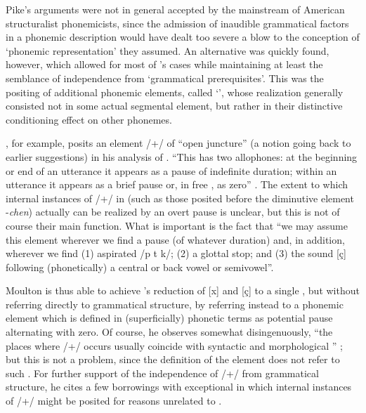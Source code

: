 Pike's arguments were not in general accepted by the mainstream of
American structuralist phonemicists, since the admission of inaudible
grammatical factors in a phonemic description would have dealt too
severe a blow to the conception of `phonemic representation' they
assumed. An alternative was quickly found, however, which allowed for
most of {\Pike}'s cases while maintaining at least the semblance of
independence from `grammatical prerequisites'. This was the positing
of additional phonemic elements, called `', whose realization
generally consisted not in some actual segmental element, but rather
in their distinctive conditioning effect on other phonemes.

\citet{moulton47:juncture}, for example, posits an element /+/ of
``open juncture'' (a notion going back to
 earlier suggestions) in his
analysis of . ``This  has two allophones: at the
beginning or end of an utterance it appears as a pause of indefinite
duration; within an utterance it appears as a brief pause or, in free
, as zero'' \citep[223]{moulton47:juncture}. The extent to
which internal instances of /+/ in  (such as those posited
before the diminutive element -\emph{chen}) actually can be realized
by an overt pause is unclear, but this is not of course their main
function. What is important is the fact that ``we may assume this
element wherever we find a pause (of whatever duration) and, in
addition, wherever we find (1) aspirated /p t k/; (2) a glottal stop;
and (3) the sound [ç] following (phonetically) a central or back vowel
or semivowel''.

Moulton is thus able to achieve {\Bloomfield}'s reduction of [x] and [ç]
to a single , but without referring directly to grammatical
structure, by referring instead to a phonemic element which is defined
in (superficially) phonetic terms as potential pause alternating with
zero. Of course, he observes somewhat disingenuously, ``the places
where /+/ occurs usually coincide with syntactic and morphological
'' \citep[224]{moulton47:juncture}; but this is not a
problem, since the definition of the element does not refer to such
. For further support of the independence of /+/ from
grammatical structure, he cites a few borrowings with exceptional
 in which internal instances of /+/ might be posited for reasons
unrelated to .

